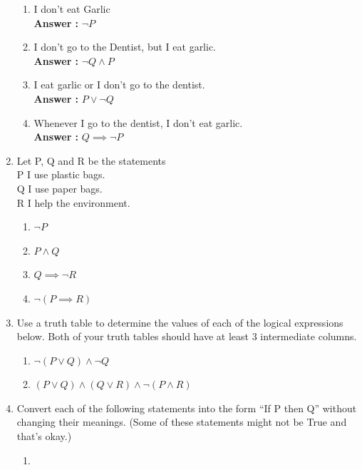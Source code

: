 \documentclass[a4paper,11pt]{article}
\begin{document}
\begin{enumerate}
  \begin{enumerate}
  \item I don't eat Garlic \\
  \textbf{Answer :} $ \neg P$
  \item I don't go to the Dentist, but I eat garlic. \\
  \textbf{Answer :} $ \neg Q \wedge P$
  \item I eat garlic or I don't go to the dentist. \\
  \textbf{Answer :} $P \vee \neg Q$
  \item Whenever I go to the dentist, I don't eat garlic. \\
  \textbf{Answer :} $ Q \implies \neg P$
  \end{enumerate}

\item Let P, Q and R be the statements \\ P I use plastic bags. \\ Q I use paper bags. \\ R I help the environment.

  \begin{enumerate}
  \item $ \neg P$
  \item $P \wedge Q$
  \item $Q \implies \neg R$
  \item $\neg (P \implies R)$
  \end{enumerate}

\item Use a truth table to determine the values of each of the logical expressions below. Both of
your truth tables should have at least 3 intermediate columns.
  \begin{enumerate}
  \item $\neg (P \vee Q) \wedge \neg Q$
  \item $ (P \vee Q) \wedge (Q \vee R) \wedge \neg (P \wedge R)$
  \end{enumerate}


\item Convert each of the following statements into the form “If P then Q” without changing
their meanings. (Some of these statements might not be True and that’s okay.)
  \begin{enumerate}
  \item
  \end{enumerate}



\end{enumerate}
\end{document}
